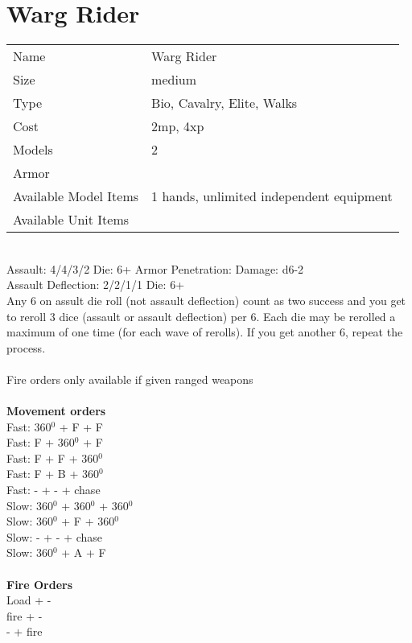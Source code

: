 \section{ Warg Rider }

\begin{tabular}{ll}
  Name & Warg Rider \\
  Size & medium\\
  Type & Bio, Cavalry, Elite, Walks\\
  Cost & 2mp, 4xp\\
  Models & 2\\
  Armor & \\
  Available Model Items & 1 hands, unlimited independent equipment \\
  Available Unit Items &  \\
\end{tabular}

\ \\
Assault: 4/4/3/2 Die: 6+ Armor Penetration:  Damage: d6-2 \\
Assault Deflection: 2/2/1/1 Die: 6+\\
\indent Any 6 on assult die roll (not assault deflection) count as two success and you get to reroll 3 dice (assault or assault deflection) per 6. Each die may be rerolled a maximum of one time (for each wave of rerolls). If you get another 6, repeat the process.  \\
\ \\
Fire orders only available if given ranged weapons
\ \\


\ \\ {\bf Movement orders } \\
Fast: 360$^0$ + F + F \\
Fast: F + 360$^0$ + F \\
Fast: F + F + 360$^0$ \\
Fast: F + B + 360$^0$ \\
Fast: - + - + chase \\
Slow: 360$^0$ + 360$^0$ + 360$^0$ \\
Slow: 360$^0$ + F + 360$^0$ \\
Slow: - + - + chase \\
Slow: 360$^0$ + A + F \\
\ \\ {\bf Fire Orders } \\
Load + - \\
fire + - \\
- + fire \\



